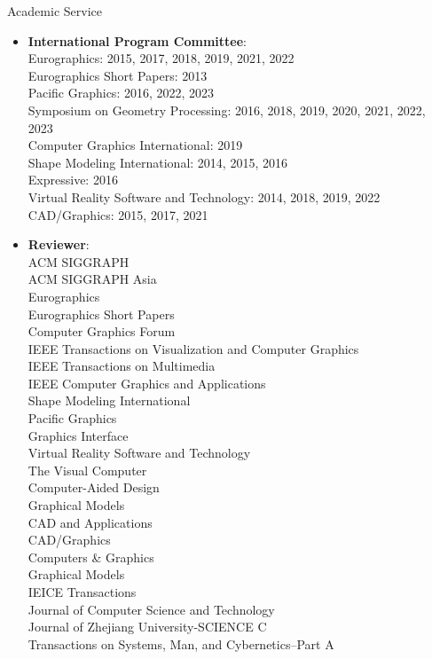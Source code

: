 {\Large\sc Academic Service}
\vspace{-3mm}
\begin{itemize}
\item {\bf International Program Committee}:\\
Eurographics: 2015, 2017, 2018, 2019, 2021, 2022\\
Eurographics Short Papers: 2013\\
Pacific Graphics: 2016, 2022, 2023\\
Symposium on Geometry Processing: 2016, 2018, 2019, 2020, 2021, 2022, 2023\\
Computer Graphics International: 2019\\
Shape Modeling International: 2014, 2015, 2016\\
Expressive: 2016\\
Virtual Reality Software and Technology: 2014, 2018, 2019, 2022\\
CAD/Graphics: 2015, 2017, 2021\\

\item {\bf Reviewer}:\\
ACM SIGGRAPH\\
ACM SIGGRAPH Asia\\
Eurographics\\
Eurographics Short Papers\\
Computer Graphics Forum\\
IEEE Transactions on Visualization and Computer Graphics\\
IEEE Transactions on Multimedia\\
IEEE Computer Graphics and Applications\\
Shape Modeling International\\
Pacific Graphics\\
Graphics Interface\\
Virtual Reality Software and Technology\\
The Visual Computer\\
Computer-Aided Design\\
Graphical Models\\
CAD and Applications\\
CAD/Graphics\\
Computers \& Graphics\\
Graphical Models\\
IEICE Transactions\\
Journal of Computer Science and Technology\\
Journal of Zhejiang University-SCIENCE C\\
Transactions on Systems, Man, and Cybernetics--Part A
\end{itemize}
